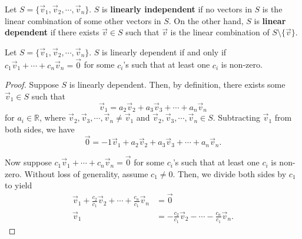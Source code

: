 \documentclass[]{book}
\begin{document}
\begin{definition}Let $S = \{\vec{v}_1, \vec{v}_2, \cdots, \vec{v}_n\}$. $S$ is \textbf{linearly independent} if no vectors in $S$ is the linear combination of some other vectors in $S$. On the other hand, $S$ is \textbf{linear dependent} if there exists $\vec{v} \in S$ such that $\vec{v}$ is the linear combination of $S \setminus \{\vec{v}\}$.
\end{definition}
\begin{theorem}
    \label{thm:linear_dependent}
    Let $S = \{\vec{v}_1, \vec{v}_2, \cdots, \vec{v}_n\}$. $S$ is linearly dependent if and only if $c_1\vec{v}_1 + \cdots + c_n\vec{v}_n = \vec{0}$ for some $c_i$'s such that at least one $c_i$ is non-zero.
\begin{proof}
    Suppose $S$ is linearly dependent. Then, by definition, there exists some $\vec{v}_1 \in S$ such that
    \[\vec{v}_1 = a_2\vec{v}_2 + a_3\vec{v}_3 + \cdots + a_n\vec{v}_n\]
    for $a_i \in \mathbb{R}$, where $\vec{v}_2, \vec{v}_3, \cdots, \vec{v}_n \neq \vec{v}_1$ and $\vec{v}_2, \vec{v}_3, \cdots, \vec{v}_n \in S$.
    Subtracting $\vec{v}_1$ from both sides, we have
    \[\vec{0} = -1\vec{v}_1 + a_2\vec{v}_2 + a_3\vec{v}_3 + \cdots + a_n\vec{v}_n.\]
    
    Now suppose $c_1\vec{v}_1 + \cdots + c_n\vec{v}_n = \vec{0}$ for some $c_i$'s such that at least one $c_i$ is non-zero. Without loss of generality, assume $c_1 \neq 0$. Then, we divide both sides by $c_1$ to yield
    \begin{align*}
        \vec{v}_1 + \frac{c_2}{c_1} \vec{v}_2 + \cdots + \frac{c_n}{c_1}\vec{v}_n &= \vec{0} \\
        \vec{v}_1 &= -\frac{c_2}{c_1}\vec{v}_2 - \cdots - \frac{c_n}{c_1}\vec{v}_n.
    \end{align*}
\end{proof}
\end{theorem}
\end{document}
